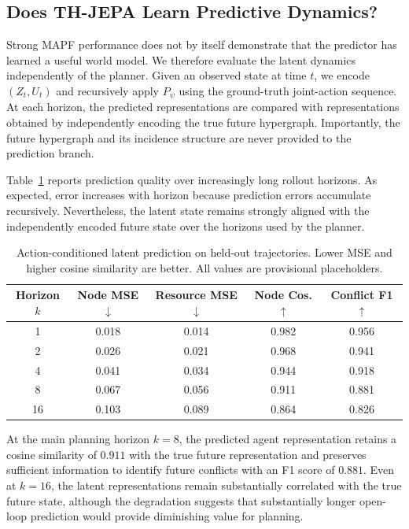 \documentclass{article} %
\begin{document}
\subsection{Does TH-JEPA Learn Predictive Dynamics?}
\label{sec:world_model_eval}

Strong MAPF performance does not by itself demonstrate that the predictor has learned a useful world model. We therefore evaluate the latent dynamics independently of the planner. Given an observed state at time $t$, we encode $(Z_t,U_t)$ and recursively apply $P_\psi$ using the ground-truth joint-action sequence. At each horizon, the predicted representations are compared with representations obtained by independently encoding the true future hypergraph. Importantly, the future hypergraph and its incidence structure are never provided to the prediction branch.

Table~\ref{tab:latent_prediction} reports prediction quality over increasingly long rollout horizons. As expected, error increases with horizon because prediction errors accumulate recursively. Nevertheless, the latent state remains strongly aligned with the independently encoded future state over the horizons used by the planner.

\begin{table}[t]
\centering
\caption{Action-conditioned latent prediction on held-out trajectories. Lower MSE and higher cosine similarity are better. All values are provisional placeholders.}
\label{tab:latent_prediction}
\small
\setlength{\tabcolsep}{5pt}
\begin{tabular}{ccccc}
\toprule
Horizon $k$
& Node MSE $\downarrow$
& Resource MSE $\downarrow$
& Node Cos. $\uparrow$
& Conflict F1 $\uparrow$ \\
\midrule
1  & 0.018 & 0.014 & 0.982 & 0.956 \\
2  & 0.026 & 0.021 & 0.968 & 0.941 \\
4  & 0.041 & 0.034 & 0.944 & 0.918 \\
8  & 0.067 & 0.056 & 0.911 & 0.881 \\
16 & 0.103 & 0.089 & 0.864 & 0.826 \\
\bottomrule
\end{tabular}
\end{table}

At the main planning horizon $k=8$, the predicted agent representation retains a cosine similarity of $0.911$ with the true future representation and preserves sufficient information to identify future conflicts with an F1 score of $0.881$. Even at $k=16$, the latent representations remain substantially correlated with the true future state, although the degradation suggests that substantially longer open-loop prediction would provide diminishing value for planning.
\end{document}
